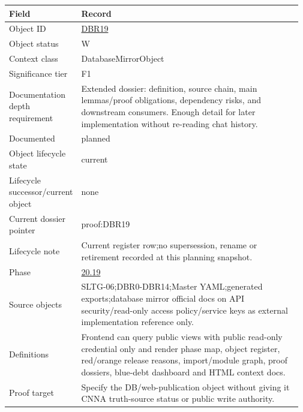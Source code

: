 \begin{longtable}{L{0.16\linewidth} L{0.81\linewidth}}
\hline
\textbf{Field} & \textbf{Record}\\
\hline
Object ID & \hyperlink{object-row-DBR19}{DBR19}\\
\hline\addlinespace[0.20em]
Object status & W\\
\hline\addlinespace[0.20em]
Context class & DatabaseMirrorObject\\
\hline\addlinespace[0.20em]
Significance tier & F1\\
\hline\addlinespace[0.20em]
Documentation depth requirement & Extended dossier: definition, source chain, main lemmas/\allowbreak{}proof obligations, dependency risks, and downstream consumers. Enough detail for later implementation without re-reading chat history.\\
\hline\addlinespace[0.20em]
Documented & planned\\
\hline\addlinespace[0.20em]
Object lifecycle state & current\\
\hline\addlinespace[0.20em]
Lifecycle successor/\allowbreak{}current object & none\\
\hline\addlinespace[0.20em]
Current dossier pointer & proof:DBR19\\
\hline\addlinespace[0.20em]
Lifecycle note & Current register row;\newline no supersession, rename or retirement recorded at this planning snapshot.\\
\hline\addlinespace[0.20em]
Phase & \hyperlink{phase-row-20-19}{20.19}\\
\hline\addlinespace[0.20em]
Source objects & SLTG-06;\newline DBR0-DBR14;\newline Master YAML;\newline generated exports;\newline database mirror official docs on API security/\allowbreak{}read-only access policy/\allowbreak{}service keys as external implementation reference only.\\
\hline\addlinespace[0.20em]
Definitions & Frontend can query public views with public read-only credential only and render phase map, object register, red/\allowbreak{}orange release reasons, import/\allowbreak{}module graph, proof dossiers, blue-debt dashboard and HTML context docs.\\
\hline\addlinespace[0.20em]
Proof target & Specify the DB/\allowbreak{}web-publication object without giving it CNNA truth-source status or public write authority.\\

\end{longtable}
